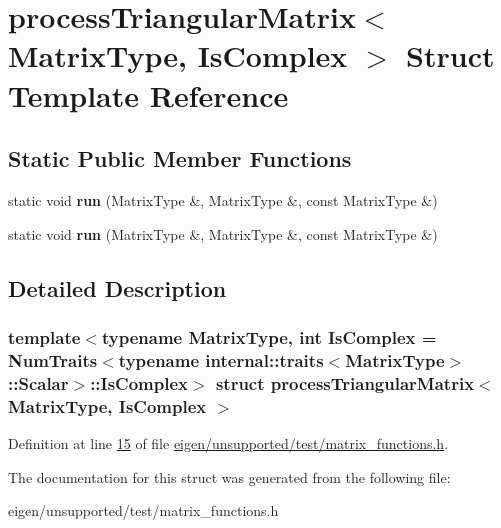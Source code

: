 \hypertarget{structprocess_triangular_matrix}{}\section{process\+Triangular\+Matrix$<$ Matrix\+Type, Is\+Complex $>$ Struct Template Reference}
\label{structprocess_triangular_matrix}
\subsection*{Static Public Member Functions}
\begin{DoxyCompactItemize}
\item 
\mbox{\label{structprocess_triangular_matrix_a5e496e4d0bba2cf276e09465c51780cf}} 
static void {\bfseries run} (Matrix\+Type \&, Matrix\+Type \&, const Matrix\+Type \&)
\item 
\mbox{\label{structprocess_triangular_matrix_a5e496e4d0bba2cf276e09465c51780cf}} 
static void {\bfseries run} (Matrix\+Type \&, Matrix\+Type \&, const Matrix\+Type \&)
\end{DoxyCompactItemize}


\subsection{Detailed Description}
\subsubsection*{template$<$typename Matrix\+Type, int Is\+Complex = Num\+Traits$<$typename internal\+::traits$<$\+Matrix\+Type$>$\+::\+Scalar$>$\+::\+Is\+Complex$>$\newline
struct process\+Triangular\+Matrix$<$ Matrix\+Type, Is\+Complex $>$}



Definition at line \hyperlink{eigen_2unsupported_2test_2matrix__functions_8h_source_l00015}{15} of file \hyperlink{eigen_2unsupported_2test_2matrix__functions_8h_source}{eigen/unsupported/test/matrix\+\_\+functions.\+h}.



The documentation for this struct was generated from the following file\+:\begin{DoxyCompactItemize}
\item 
eigen/unsupported/test/matrix\+\_\+functions.\+h\end{DoxyCompactItemize}
